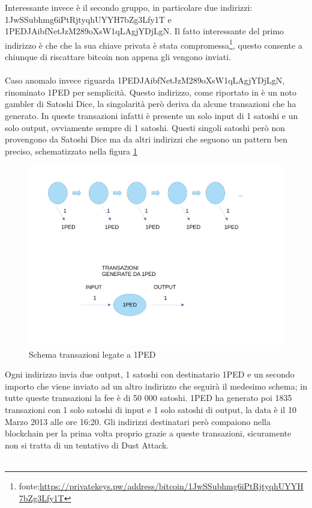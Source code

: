 Interessante invece è il secondo gruppo, in particolare due indirizzi: 1JwSSubhmg6iPtRjtyqhUYYH7bZg3Lfy1T e 1PEDJAibfNetJzM289oXsW1qLAgjYDjLgN. Il fatto interessante del primo indirizzo è che che la sua chiave privata è stata compromessa\footnote{fonte:\url{https://privatekeys.pw/address/bitcoin/1JwSSubhmg6iPtRjtyqhUYYH7bZg3Lfy1T}}, questo consente a chiunque di riscattare bitcoin non appena gli vengono inviati.\\\\
Caso anomalo invece riguarda 1PEDJAibfNetJzM289oXsW1qLAgjYDjLgN, rinominato 1PED per semplicità. Questo indirizzo, come riportato in\cite{dustAnalisi} è un noto gambler di Satoshi Dice, la singolarità però deriva da alcune transazioni che ha generato. In queste transazioni infatti è presente un solo input di 1 satoshi e un solo output, ovviamente sempre di 1 satoshi. Questi singoli satoshi però non provengono da Satoshi Dice ma da altri indirizzi che seguono un pattern ben preciso, schematizzato nella figura \ref{fig:1PED}
\begin{figure}[h!]
    \centering
    \includegraphics[scale=0.4]{Images/1Ped.pdf}
    \caption{Schema transazioni legate a 1PED}
    \label{fig:1PED}
\end{figure}
\FloatBarrier
Ogni indirizzo invia due output, 1 satoshi con destinatario 1PED e un secondo importo che viene inviato ad un altro indirizzo che seguirà il medesimo schema; in tutte queste transazioni la fee è di 50 000 satoshi. 1PED ha generato poi 1835 transazioni con 1 solo satoshi di input e 1 solo satoshi di output, la data è il 10 Marzo 2013 alle ore 16:20. Gli indirizzi destinatari però compaiono nella blockchain per la prima volta proprio grazie a queste transazioni, sicuramente non si tratta di un tentativo di Dust Attack.\\\\
